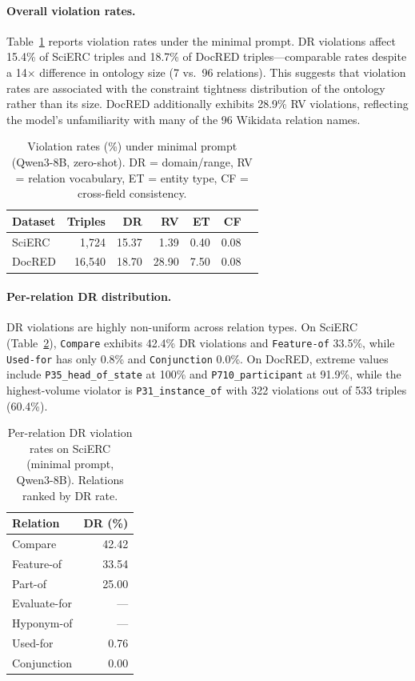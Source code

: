 \documentclass[11pt,a4paper]{article}
\begin{document}
\paragraph{Overall violation rates.}
Table~\ref{tab:landscape} reports violation rates under the minimal prompt.
DR violations affect 15.4\% of SciERC triples and 18.7\% of DocRED triples---comparable rates despite a 14$\times$ difference in ontology size (7 vs.\ 96 relations).
This suggests that violation rates are associated with the constraint tightness distribution of the ontology rather than its size.
DocRED additionally exhibits 28.9\% RV violations, reflecting the model's unfamiliarity with many of the 96 Wikidata relation names.

\begin{table}[t]
\centering
\caption{Violation rates (\%) under minimal prompt (Qwen3-8B, zero-shot). DR = domain/range, RV = relation vocabulary, ET = entity type, CF = cross-field consistency.}
\label{tab:landscape}
\small
\begin{tabular}{lrrrrrr}
\toprule
\textbf{Dataset} & \textbf{Triples} & \textbf{DR} & \textbf{RV} & \textbf{ET} & \textbf{CF} \\
\midrule
SciERC  & 1{,}724  & 15.37 & 1.39 & 0.40 & 0.08 \\
DocRED  & 16{,}540 & 18.70 & 28.90 & 7.50 & 0.08 \\
\bottomrule
\end{tabular}
\end{table}

\paragraph{Per-relation DR distribution.}
DR violations are highly non-uniform across relation types.
On SciERC (Table~\ref{tab:per_relation}), \texttt{Compare} exhibits 42.4\% DR violations and \texttt{Feature-of} 33.5\%, while \texttt{Used-for} has only 0.8\% and \texttt{Conjunction} 0.0\%.
On DocRED, extreme values include \texttt{P35\_head\_of\_state} at 100\% and \texttt{P710\_participant} at 91.9\%, while the highest-volume violator is \texttt{P31\_instance\_of} with 322 violations out of 533 triples (60.4\%).

\begin{table}[t]
\centering
\caption{Per-relation DR violation rates on SciERC (minimal prompt, Qwen3-8B). Relations ranked by DR rate.}
\label{tab:per_relation}
\small
\begin{tabular}{lr}
\toprule
\textbf{Relation} & \textbf{DR (\%)} \\
\midrule
Compare       & 42.42 \\
Feature-of    & 33.54 \\
Part-of       & 25.00 \\
Evaluate-for  & --- \\
Hyponym-of    & --- \\
Used-for      & 0.76 \\
Conjunction   & 0.00 \\
\bottomrule
\end{tabular}
\end{table}
\end{document}
